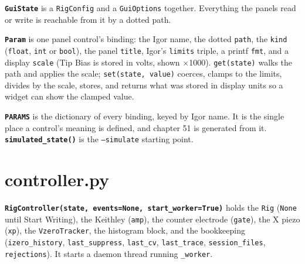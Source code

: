 \textbf{\texttt{Gui\discretionary{}{}{}State}} is a \texttt{Rig\discretionary{}{}{}Config} and a \texttt{Gui\discretionary{}{}{}Options} together. Everything the panels read or write is reachable from it by a dotted path.

\textbf{\texttt{Param}} is one panel control's binding: the Igor name, the dotted \texttt{path}, the \texttt{kind} (\texttt{float}, \texttt{int} or \texttt{bool}), the panel \texttt{title}, Igor's \texttt{limits} triple, a printf \texttt{fmt}, and a display \texttt{scale} (Tip Bias is stored in volts, shown $\times$1000). \texttt{get(state)} walks the path and applies the scale; \texttt{set(state,\discretionary{}{}{} value)} coerces, clamps to the limits, divides by the scale, stores, and returns what was stored in display units so a widget can show the clamped value.

\textbf{\texttt{PARAMS}} is the dictionary of every binding, keyed by Igor name. It is the single place a control's meaning is defined, and chapter 51 is generated from it. \textbf{\texttt{simulated\_\discretionary{}{}{}state()}} is the \texttt{--simulate} starting point.

\section{controller.py}

\textbf{\texttt{Rig\discretionary{}{}{}Controller(state,\discretionary{}{}{} events=None,\discretionary{}{}{} start\_\discretionary{}{}{}worker=True)}} holds the \texttt{Rig} (\texttt{None} until Start Writing), the Keithley (\texttt{amp}), the counter electrode (\texttt{gate}), the X piezo (\texttt{xp}), the \texttt{Vzero\discretionary{}{}{}Tracker}, the histogram block, and the bookkeeping (\texttt{izero\_\discretionary{}{}{}history}, \texttt{last\_\discretionary{}{}{}suppress}, \texttt{last\_\discretionary{}{}{}cv}, \texttt{last\_\discretionary{}{}{}trace}, \texttt{session\_\discretionary{}{}{}files}, \texttt{rejections}). It starts a daemon thread running \texttt{\_\discretionary{}{}{}worker}.


